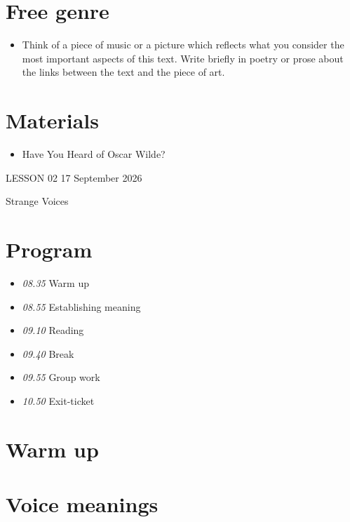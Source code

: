 \documentclass[11pt,a4paper,oneside]{book}
\begin{document}
\section*{Free genre}

\begin{itemize}
\item Think of a piece of music or a picture which reflects what you consider the most important aspects of this text. Write briefly in poetry or prose about the links between the text and the piece of art.
\end{itemize}

\section*{Materials}

\begin{itemize}
\item Have You Heard of Oscar Wilde?
\end{itemize}

\clearpage{}
{\color{blue}\small LESSON 02 \hfill 17 September 2026\par}
\vspace{4mm}
{\displayfont\color{navy}\fontsize{30}{34}\selectfont Strange Voices\par}\vspace{4mm}

\section*{Program}

\begin{itemize}
\item \emph{08.35} Warm up
\item \emph{08.55} Establishing meaning
\item \emph{09.10} Reading
\item \emph{09.40} Break
\item \emph{09.55} Group work
\item \emph{10.50} Exit-ticket
\end{itemize}

\section*{Warm up}

\section*{Voice meanings}
\end{document}
